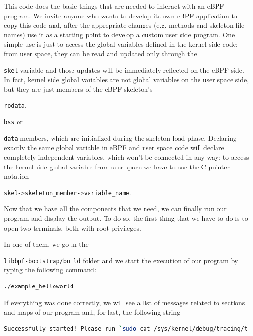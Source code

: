 This code does the basic things that are needed to interact with an eBPF program.
We invite anyone who wants to develop its own eBPF application to copy this code and, after the appropriate changes (e.g. methods and skeleton file names) use it as a starting point to develop a custom user side program.
One simple use is just to access the global variables defined in the kernel side code: from user space, they can be read and updated only through the \raggedright\colorbox{backcolour}{\lstinline[style=commandline, language=bash]|skel|} variable and those updates will be immediately reflected on the eBPF side. 
In fact, kernel side global variables are not global variables on the user space side, but they are just members of the eBPF skeleton’s \raggedright\colorbox{backcolour}{\lstinline[style=commandline, language=bash]|rodata|}, \raggedright\colorbox{backcolour}{\lstinline[style=commandline, language=bash]|bss|} or \raggedright\colorbox{backcolour}{\lstinline[style=commandline, language=bash]|data|} members, which are initialized during the skeleton load phase. 
Declaring exactly the same global variable in eBPF and user space code will declare completely independent variables, which won’t be connected in any way: to access the kernel side global variable from user space we have to use the C pointer notation \raggedright\colorbox{backcolour}{\lstinline[style=commandline, language=bash]|skel->skeleton_member->variable_name|}.

Now that we have all the components that we need, we can finally run our program and display the output.
To do so, the first thing that we have to do is to open two terminals, both with root privileges.

In one of them, we go in the \raggedright\colorbox{backcolour}{\lstinline[style=commandline, language=bash]|libbpf-bootstrap/build|} folder and we start the execution of our program by typing the following command:

\begin{lstlisting}[style=commandline, language=bash, caption={libbpf-bootstrap program's execution command.}]
	./example_helloworld
\end{lstlisting}

If everything was done correctly, we will see a list of messages related to sections and maps of our program and, for last, the following string:

\begin{lstlisting}[style=commandline, language=bash, caption={Program's successful execution message in libbpf-bootstrap.}]
	Successfully started! Please run `sudo cat /sys/kernel/debug/tracing/trace_pipe` to see output of the BPF programs.
\end{lstlisting}

